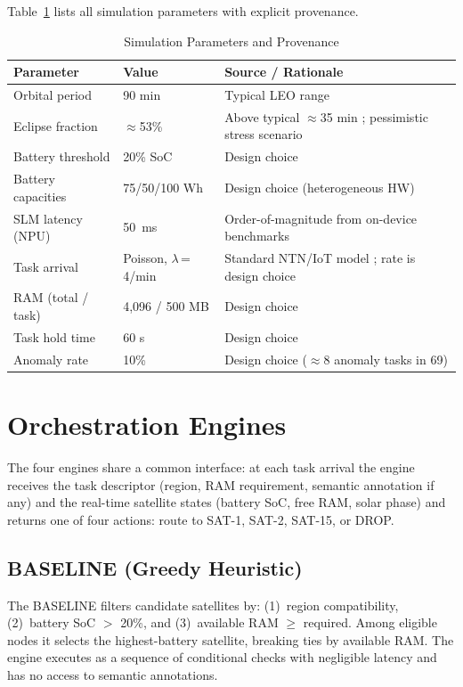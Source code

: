 \documentclass[conference,comsoc,twoside,caption=false]{IEEEtran}
\let\MYoriglatexcaption\caption
\renewcommand{\caption}[2][\relax]{\MYoriglatexcaption[#2]{#2}}
\theoremstyle{definition}
\begin{document}
Table~\ref{tab:params} lists all simulation parameters with explicit provenance.

\begin{table}[!t]
\centering
\caption{Simulation Parameters and Provenance}
\label{tab:params}
\footnotesize
\begin{tabular}{p{2.2cm}p{1.5cm}p{3.9cm}}
\toprule
\textbf{Parameter} & \textbf{Value} & \textbf{Source / Rationale} \\
\midrule
Orbital period   & 90 min           & Typical LEO range \cite{guo2024,gpp2022} \\
Eclipse fraction & $\approx$53\%    & Above typical $\approx$35 min \cite{sumanth2019}; pessimistic stress scenario \\
Battery threshold & 20\% SoC        & Design choice \\
Battery capacities & 75/50/100 Wh  & Design choice (heterogeneous HW) \\
SLM latency (NPU) & \SI{50}{\milli\second} & Order-of-magnitude from on-device benchmarks \cite{wang2025} \\
Task arrival     & Poisson, $\lambda$\,=\,4/min & Standard NTN/IoT model \cite{guo2024}; rate is design choice \\
RAM (total / task) & 4{,}096 / 500 MB & Design choice \\
Task hold time   & 60 s             & Design choice \\
Anomaly rate     & 10\%             & Design choice ($\approx$8 anomaly tasks in 69) \\
\bottomrule
\end{tabular}
\end{table}

\section{Orchestration Engines}
\label{sec:engines}

The four engines share a common interface: at each task arrival the engine
receives the task descriptor (region, RAM requirement, semantic annotation if
any) and the real-time satellite states (battery \ac{SoC}, free RAM, solar
phase) and returns one of four actions: route to SAT-1, SAT-2, SAT-15, or DROP.

\subsection{BASELINE (Greedy Heuristic)}
The BASELINE filters candidate satellites by: (1)~region compatibility,
(2)~battery \ac{SoC} $>$ 20\%, and (3)~available RAM $\geq$ required. Among
eligible nodes it selects the highest-battery satellite, breaking ties by
available RAM. The engine executes as a sequence of conditional checks with
negligible latency and has no access to semantic annotations.
\end{document}
